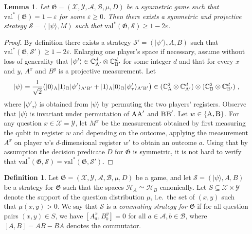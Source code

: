 \documentclass[11pt]{article}
\newtheorem{lemma}[theorem]{Lemma}
\theoremstyle{definition}
\newtheorem{definition}[theorem]{Definition}
\newcommand{\ket}[1]{|#1\rangle}
\newcommand{\C}{\ensuremath{\mathbb{C}}}
\newcommand{\mH}{\ensuremath{\mathcal{H}}}
\newcommand{\val}{\ensuremath{\mathrm{val}}}
\newcommand{\eps}{\varepsilon}
\newcommand{\game}{\mathfrak{G}}
\newcommand{\strategy}{\mathscr{S}}
\newcommand{\labelstyle}[1]{\ensuremath{\textsc{#1}}\xspace}
\newcommand{\alice}{\labelstyle{A}}
\newcommand{\bob}{\labelstyle{B}}
\renewcommand{\cal}[1]{\mathcal{#1}}
\begin{document}
\begin{lemma}\label{lem:symmetric-strat}
Let $\game = (\cal{X}, \cal{Y}, \cal{A}, \cal{B}, \mu, D)$  be a symmetric game such that $\val^*(\game) = 1-\eps$ for some $\eps\geq 0$. Then there exists a symmetric and projective strategy $\strategy=(\ket{\psi},M)$ such that $\val^*(\game,\strategy)\geq 1-2\eps$. 
\end{lemma}

\begin{proof}
By definition there exists a strategy $\strategy'= (\ket{\psi'},A,B)$ such that $\val^*(\game,\strategy')\geq 1-2\eps$. Enlarging one player's space if necessary, assume without loss of generality that $\ket{\psi'}\in\C_{\alice'}^d\otimes \C_{\bob'}^d$ for some integer $d$ and that for every $x$ and $y$, $A^x$ and $B^y$ is a projective measurement. Let 
\[ \ket{\psi} = \frac{1}{\sqrt{2}}\big( \ket{0}_\alice \ket{1}_\bob \ket{\psi'}_{\alice'\bob'} + \ket{1}_\alice \ket{0}_\bob \ket{\psi'_\tau}_{\alice'\bob'}\big) \in (\C_{\alice}^2 \otimes \C_{\alice'}^d) \otimes (\C_\bob^2 \otimes \C_{\bob'}^d)\;,\]
where $\ket{\psi'_\tau}$ is obtained from $\ket{\psi}$ by permuting the two players' registers. Observe that $\ket{\psi}$ is invariant under permutation of $\alice\alice'$ and $\bob\bob'$. Let $w\in \{\alice,\bob\}$. For any question $x\in \cal{X}=\cal{Y}$, let $M^x$ be the measurement obtained by first measuring the qubit in register $w$ and depending on the outcome, applying the measurement $A^x$ on player $w$'s $d$-dimensional register $w'$ to obtain an outcome $a$. Using that by assumption the decision predicate $D$ for $\game$ is symmetric, it is not hard to verify that $\val^*(\game,\strategy) = \val^*(\game,\strategy')$. 
\end{proof}


\begin{definition}
  \label{def:comm-strategy}
  Let $\game = (\cal{X}, \cal{Y}, \cal{A}, \cal{B}, \mu, D)$ be a game, and let
  $\strategy = (\ket{\psi}, A, B)$ be a strategy for $\game$ such that the
  spaces $\mH_A \simeq \mH_B$ canonically.
  Let $S \subseteq \cal{X} \times \cal{Y}$ denote the support of the question
  distribution $\mu$, i.e.\ the set of $(x,y)$ such that $\mu(x,y)>0$.
  We say that $\strategy$ is a \emph{commuting strategy for $\game$} if for all
  question pairs $(x, y) \in S$, we have $[A^x_a, B^y_b] = 0$ 
  for all $a
  \in \cal{A}, b \in \cal{B}$, where $[A, B] = AB - BA$ denotes the commutator.
\end{definition}
\end{document}
